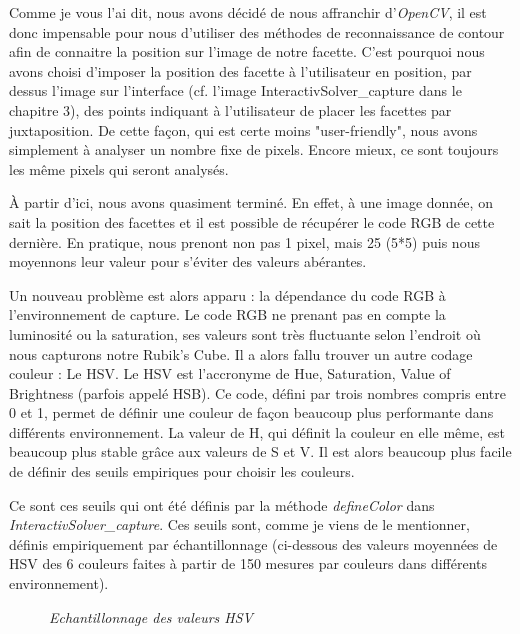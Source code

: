 Comme je vous l'ai dit, nous avons décidé de nous affranchir d'\textit{OpenCV}, il est donc impensable pour nous d'utiliser des méthodes de reconnaissance de contour
afin de connaitre la position sur l'image de notre facette. 
C'est pourquoi nous avons choisi d'imposer la position des facette à l'utilisateur en position, par dessus l'image sur l'interface (cf. l'image InteractivSolver\_capture
dans le chapitre 3), des points indiquant à l'utilisateur de placer les facettes par juxtaposition. De cette façon, qui est certe moins "user-friendly", nous avons simplement 
à analyser un nombre fixe de pixels. Encore mieux, ce sont toujours les même pixels qui seront analysés.

À partir d'ici, nous avons quasiment terminé. En effet, à une image donnée, on sait la position des facettes et il est possible de récupérer le code RGB de cette dernière. 
En pratique, nous prenont non pas 1 pixel, mais 25 (5*5) puis nous moyennons leur valeur pour s'éviter des valeurs abérantes.

Un nouveau problème est alors apparu : la dépendance du code RGB à l'environnement de capture. Le code RGB ne prenant pas en compte la luminosité ou la saturation, ses valeurs 
sont très fluctuante selon l'endroit où nous capturons notre Rubik's Cube. Il a alors fallu trouver un autre codage couleur : Le HSV.
Le HSV est l'accronyme de Hue, Saturation, Value of Brightness (parfois appelé HSB). Ce code, défini par trois nombres compris entre 0 et 1, permet de définir une couleur de façon 
beaucoup plus performante dans différents environnement. La valeur de H, qui définit la couleur en elle même, est beaucoup plus stable grâce aux valeurs de S et V. Il est alors beaucoup 
plus facile de définir des seuils empiriques pour choisir les couleurs.

Ce sont ces seuils qui ont été définis par la méthode \textit{defineColor} dans \textit{InteractivSolver\_capture}.
Ces seuils sont, comme je viens de le mentionner, définis empiriquement par échantillonnage (ci-dessous des valeurs moyennées de HSV des 6 couleurs faites à partir de 150 mesures par couleurs dans différents environnement).

\begin{figure}[H]
\begin{center}
\end{center}
	\caption{ \textit{Echantillonnage des valeurs HSV}}
\end{figure}

